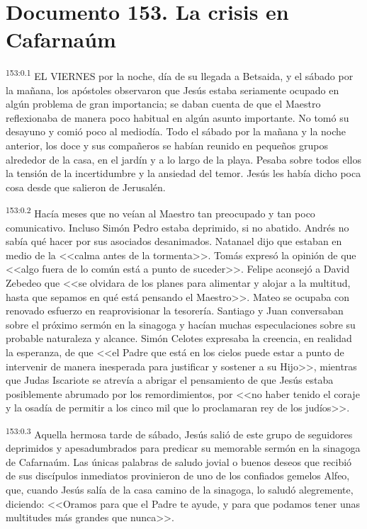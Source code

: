 \chapter{Documento 153. La crisis en Cafarnaúm}
\par 
\textsuperscript{153:0.1} EL VIERNES por la noche, día de su llegada a Betsaida, y el sábado por la mañana, los apóstoles observaron que Jesús estaba seriamente ocupado en algún problema de gran importancia; se daban cuenta de que el Maestro reflexionaba de manera poco habitual en algún asunto importante. No tomó su desayuno y comió poco al mediodía. Todo el sábado por la mañana y la noche anterior, los doce y sus compañeros se habían reunido en pequeños grupos alrededor de la casa, en el jardín y a lo largo de la playa. Pesaba sobre todos ellos la tensión de la incertidumbre y la ansiedad del temor. Jesús les había dicho poca cosa desde que salieron de Jerusalén.

\par 
\textsuperscript{153:0.2} Hacía meses que no veían al Maestro tan preocupado y tan poco comunicativo. Incluso Simón Pedro estaba deprimido, si no abatido. Andrés no sabía qué hacer por sus asociados desanimados. Natanael dijo que estaban en medio de la <<calma antes de la tormenta>>. Tomás expresó la opinión de que <<algo fuera de lo común está a punto de suceder>>. Felipe aconsejó a David Zebedeo que <<se olvidara de los planes para alimentar y alojar a la multitud, hasta que sepamos en qué está pensando el Maestro>>. Mateo se ocupaba con renovado esfuerzo en reaprovisionar la tesorería. Santiago y Juan conversaban sobre el próximo sermón en la sinagoga y hacían muchas especulaciones sobre su probable naturaleza y alcance. Simón Celotes expresaba la creencia, en realidad la esperanza, de que <<el Padre que está en los cielos puede estar a punto de intervenir de manera inesperada para justificar y sostener a su Hijo>>, mientras que Judas Iscariote se atrevía a abrigar el pensamiento de que Jesús estaba posiblemente abrumado por los remordimientos, por <<no haber tenido el coraje y la osadía de permitir a los cinco mil que lo proclamaran rey de los judíos>>.

\par 
\textsuperscript{153:0.3} Aquella hermosa tarde de sábado, Jesús salió de este grupo de seguidores deprimidos y apesadumbrados para predicar su memorable sermón en la sinagoga de Cafarnaúm. Las únicas palabras de saludo jovial o buenos deseos que recibió de sus discípulos inmediatos provinieron de uno de los confiados gemelos Alfeo, que, cuando Jesús salía de la casa camino de la sinagoga, lo saludó alegremente, diciendo: <<Oramos para que el Padre te ayude, y para que podamos tener unas multitudes más grandes que nunca>>.

